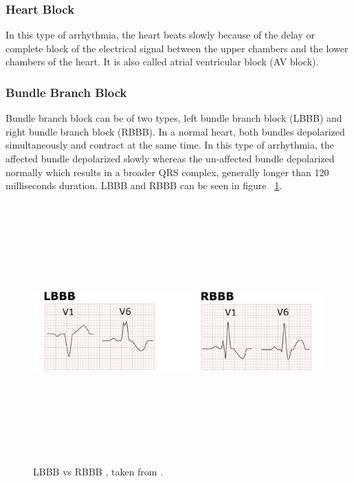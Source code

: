 \subsubsection{Heart Block}
In this type of arrhythmia, the heart beats slowly because of the delay or complete block of the electrical signal between the upper chambers and the lower chambers of the heart. It is also called atrial ventricular block (AV block).

\subsubsection{Bundle Branch Block}
Bundle branch block can be of two types, left bundle branch block (LBBB) and right bundle branch block (RBBB). In a normal heart, both bundles depolarized simultaneously and contract at the same time. In this type of arrhythmia, the affected bundle depolarized slowly whereas the un-affected bundle depolarized normally which results in a broader QRS complex, generally longer than 120 milliseconds duration. LBBB and RBBB can be seen in figure ~\ref{fig:LRBBB}.


\begin{figure}[htpb]
	\centering
	\includegraphics[width=12cm,height=10cm,keepaspectratio=true]{images/LRBBB}
	\caption{
		LBBB vs RBBB , taken from \cite{bilagi}.
	}
	\label{fig:LRBBB}
\end{figure}